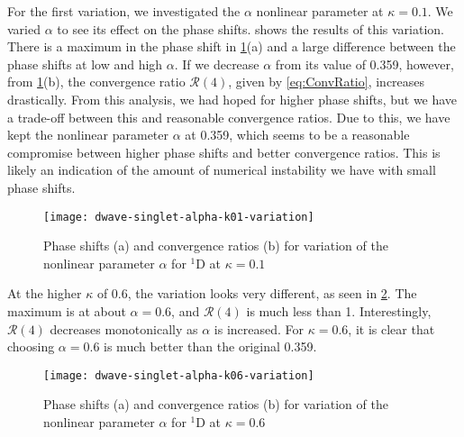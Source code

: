 \documentclass[Dissertation.tex]{subfiles}
\begin{document}
For the first variation, we investigated the $\alpha$ nonlinear parameter at
$\kappa = 0.1$. We varied $\alpha$ to see its effect on the phase shifts.
 shows the results of this
variation. There is a maximum in the phase shift in 
\cref{fig:dwave-singlet-alpha-k01-variation}(a) and a large difference between
the phase shifts at low and high $\alpha$. If we decrease
$\alpha$ from its value of 0.359, however, from
\cref{fig:dwave-singlet-alpha-k01-variation}(b),
the convergence ratio $\mathcal{R}(4)$, given by \cref{eq:ConvRatio},
increases drastically. From this analysis, we had hoped for higher phase shifts,
but we have a trade-off between this and reasonable convergence ratios. Due to
this, we have kept the nonlinear parameter $\alpha$ at 0.359, which seems to be
a reasonable compromise between higher phase shifts and better convergence
ratios. This is likely an indication of the amount of numerical instability
we have with small phase shifts.


\begin{figure}[H]
	\centering
	\texttt{[image: dwave-singlet-alpha-k01-variation]}
	\caption[Variation of the nonlinear parameter $\alpha$ for $^{1}$D at $\kappa = 0.1$]{Phase shifts (a) and convergence ratios (b) for variation of the nonlinear parameter $\alpha$ for $^{1}$D at $\kappa = 0.1$}
	\label{fig:dwave-singlet-alpha-k01-variation}
\end{figure}

At the higher $\kappa$ of 0.6, the variation looks very different, as seen in
\cref{fig:dwave-singlet-alpha-k06-variation}. The maximum is at about
$\alpha = 0.6$, and $\mathcal{R}(4)$ is much less than 1. Interestingly,
$\mathcal{R}(4)$ decreases monotonically as $\alpha$ is increased. For
$\kappa = 0.6$, it is clear that choosing $\alpha = 0.6$ is much better than
the original 0.359.

\begin{figure}[H]
	\centering
	\texttt{[image: dwave-singlet-alpha-k06-variation]}
	\caption[Variation of the nonlinear parameter $\alpha$ for $^{1}$D at $\kappa = 0.6$]{Phase shifts (a) and convergence ratios (b) for variation of the nonlinear parameter $\alpha$ for $^{1}$D at $\kappa = 0.6$}
	\label{fig:dwave-singlet-alpha-k06-variation}
\end{figure}
\end{document}
